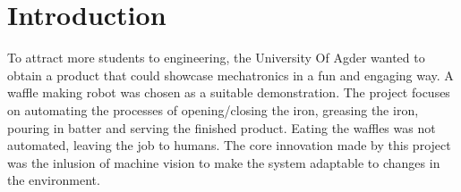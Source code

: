 \section{Introduction}
To attract more students to engineering, the University Of Agder wanted to obtain a product that could showcase mechatronics in a fun and engaging way. A waffle making robot was chosen as a suitable demonstration. The project focuses on automating the processes of opening/closing the iron, greasing the iron, pouring in batter and serving the finished product. Eating the waffles was not automated, leaving the job to humans. The core innovation made by this project was the inlusion of machine vision to make the system adaptable to changes in the environment. 

